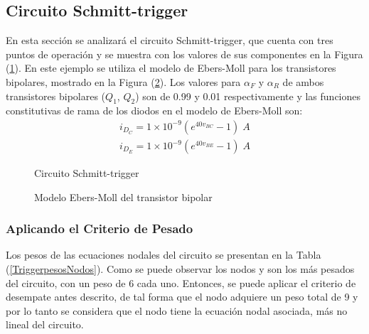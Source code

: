 \documentclass[conference,letterpaper,onecolumn]{IEEEtran}
\begin{document}
\subsection{Circuito Schmitt-trigger}
En esta secci\'on se analizar\'a el circuito Schmitt-trigger, que
cuenta con tres puntos de operaci\'on  y  se muestra con los valores
de sus componentes en la Figura (\ref{Ftrigger}).
En este ejemplo se utiliza el modelo de Ebers-Moll para los transistores
bipolares, mostrado en la Figura (\ref{FEbersMoll}).
Los valores para $\alpha_F$ y $\alpha_R$ de ambos transistores bipolares
($Q_1$, $Q_2$) son de 0.99 y 0.01 respectivamente
y las funciones constitutivas de rama de los diodos en el modelo de
Ebers-Moll son:
\begin{displaymath}
\begin{array}{r}
i_{D_C}= 1\times 10^{-9} (e^{40v_{BC}}-1) \;A \\
i_{D_E}= 1\times 10^{-9} (e^{40v_{BE}}-1) \;A
\end{array}
\end{displaymath}

\begin{figure}[!h]
\centerline{
\epsfxsize=80mm
}
\caption{Circuito Schmitt-trigger}
\label{Ftrigger}
\end{figure}

\begin{figure}[!h]
\centerline{
\epsfxsize=40mm
}
\caption{Modelo Ebers-Moll del transistor bipolar}
\label{FEbersMoll}
\end{figure}


\subsubsection{Aplicando el Criterio de Pesado}
Los pesos de las ecuaciones nodales del circuito se presentan en la Tabla
(\ref{TriggerpesosNodos}).
Como se puede observar los nodos  y  son los m\'as
pesados del circuito, con un peso de 6 cada uno. Entonces, se puede
aplicar el criterio de desempate antes descrito, 
de tal forma que el nodo  adquiere un peso total de 9 y por lo
tanto se considera que el nodo  tiene la ecuaci\'on nodal
asociada, m\'as no lineal del circuito.

\begin{table}[!h]
\caption{Pesos de los nodos del circuito Schmitt-trigger }
\label{TriggerpesosNodos}
\end{table}
\end{document}
